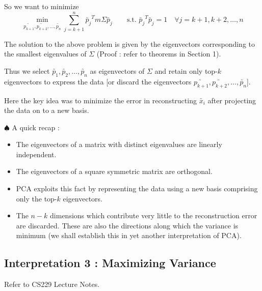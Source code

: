 \documentclass[11pt, a4paper]{article}
\begin{document}
So we want to minimize
\[
\min_{\utilde{p_{k+1}}, \utilde{p_{k+2}}, \ldots, \utilde{p_n}} \sum_{j=k+1}^{n} \utilde{p_j}^T m \Sigma \utilde{p_j}
\qquad \text{s.t. } \utilde{p_j}^T \utilde{p_j} = 1 \quad \forall j = k+1, k+2, \ldots, n
\]

The solution to the above problem is given by the eigenvectors corresponding to the smallest eigenvalues of $\Sigma$ (Proof : refer to theorems in Section 1). \\

\vspace{0.3cm}

Thus we select $\utilde{p_1}, \utilde{p_2}, \ldots, \utilde{p_n}$ as eigenvectors of $\Sigma$ and retain only top-$k$ eigenvectors to express the data [or discard the eigenvectors $\utilde{p_{k+1}}, \utilde{p_{k+2}}, \ldots, \utilde{p_n}$]. \\

\vspace{0.3cm}

Here the key idea was to minimize the error in reconstructing $\utilde{x_i}$ after projecting the data on to a new basis. \\

\vspace{0.3cm}

$\spadesuit$ A quick recap :

\begin{itemize}
\item The eigenvectors of a matrix with distinct eigenvalues are linearly independent.
\item The eigenvectors of a square symmetric matrix are orthogonal.
\item PCA exploits this fact by representing the data using a new basis comprising only the top-$k$ eigenvectors.
\item The $n - k$ dimensions which contribute very little to the reconstruction error are discarded. These are also the directions along which the variance is minimum (we shall establish this in yet another interpretation of PCA).
\end{itemize}



\subsection{Interpretation 3 : Maximizing Variance}

Refer to CS229 Lecture Notes. \\[0.2em]
\end{document}

